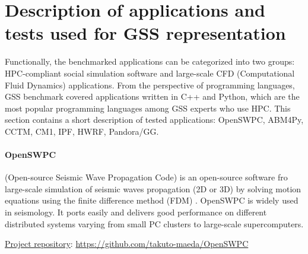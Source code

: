 \section{Description of applications and tests used for GSS representation}
Functionally, the  benchmarked  applications  can  be  categorized  into  two  groups: HPC-compliant social simulation software and large-scale CFD (Computational Fluid Dynamics) applications. From the perspective of programming languages, GSS benchmark covered applications written in C++ and Python, which are the most popular programming languages among GSS experts who use HPC.
This section contains a short description of tested applications: OpenSWPC, ABM4Py, CCTM, CM1, IPF, HWRF, Pandora/GG.

\paragraph{OpenSWPC} (Open-source Seismic Wave Propagation Code) is an open-source software fro large-scale simulation of seismic waves propagation (2D or 3D) by solving motion equations using the finite difference method (FDM) \cite{OpenSWPC2}. OpenSWPC is widely used in seismology. It ports easily and delivers good performance on different distributed systems varying from small PC clusters to large-scale supercomputers.
\iffalse
Without modifying the code, users can simulate seismic wave propagation using their own speed structure models and the necessary source representations in the input parameter file. The software code is equipped with a frequency-independent damping model based on a generalised Zener (standard linear solid - SLS model) body and an efficiently selected, perfectly matched boundary absorbing layer. It has different modes for the different input data types of the velocity structure model and different source representations, such as single force, torque tensioner and flat frequency, which can be easily selected by input parameters. Common binary data formats, a common network data form (NetCDF), and a seismic analysis code (SAC) are used to input a heterogeneous structure model and simulation results so that users can easily operate their input and output data sets. All codes are written in Fortran 2003 and are available with detailed documents in a public repository.
\fi

\underline{Project repository}: \url{https://github.com/takuto-maeda/OpenSWPC}

